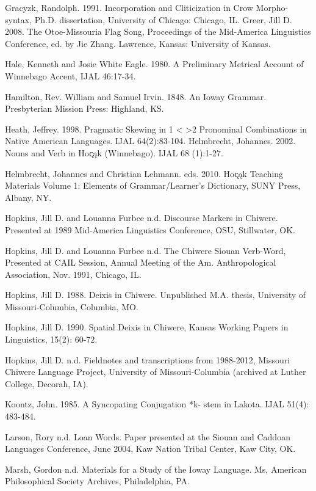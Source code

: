\documentclass[output=paper]{LSP/langsci}
\begin{document}
\begin{reflist}
Gracyzk, Randolph. 1991. Incorporation and Cliticization in Crow Morpho-syntax, Ph.D. dissertation,	University of Chicago:  Chicago, IL.   							    
Greer, Jill D.  2008.  The Otoe-Missouria Flag Song, Proceedings of the Mid-America Linguistics Conference, ed. by Jie Zhang.  Lawrence, Kansas:  University of Kansas. 		     

Hale, Kenneth and Josie White Eagle. 1980.  A Preliminary Metrical Account of Winnebago Accent, IJAL 46:17-34.   

Hamilton, Rev. William and Samuel Irvin. 1848.  An Ioway Grammar.  Presbyterian Mission Press:  Highland, KS.    	
									   
Heath, Jeffrey. 1998. Pragmatic Skewing in 1 < >2 Pronominal Combinations in Native American Languages. IJAL 64(2):83-104.    					      		      
Helmbrecht, Johannes.  2002.  Nouns and Verb in Ho\k{c}\k{a}k (Winnebago). IJAL 68 (1):1-27.  		                        

Helmbrecht, Johannes and Christian Lehmann. eds. 2010.  Ho\k{c}\k{a}k Teaching Materials Volume 1: Elements of Grammar/Learner's Dictionary,  SUNY Press, Albany, NY.

Hopkins, Jill D. and Louanna Furbee n.d. Discourse Markers in Chiwere. Presented at 1989 Mid-America Linguistics Conference, OSU, Stillwater, OK.  	   

Hopkins, Jill D. and Louanna Furbee  n.d. The Chiwere Siouan Verb-Word, Presented at CAIL  Session, Annual Meeting of the Am. Anthropological Association, Nov. 1991,  Chicago, IL.   

Hopkins, Jill D. 1988. Deixis in Chiwere. Unpublished M.A. thesis, University of Missouri-Columbia, Columbia, MO.								  	   

Hopkins, Jill D. 1990. Spatial Deixis in Chiwere, Kansas Working Papers in Linguistics, 15(2): 60-72. 
 
Hopkins, Jill D. n.d.  Fieldnotes and transcriptions from 1988-2012, Missouri Chiwere Language Project, University of Missouri-Columbia (archived at Luther College, Decorah, IA).  		
 
Koontz, John. 1985. A Syncopating Conjugation *k- stem in Lakota.  IJAL 51(4): 483-484.           
  
Larson, Rory n.d.  Loan Words. Paper presented at the Siouan and Caddoan Languages Conference, June 2004, Kaw Nation Tribal Center, Kaw City, OK.  	
  			  	   
Marsh, Gordon  n.d.  Materials for a Study of the Ioway Language.  Ms, American Philosophical Society Archives, Philadelphia, PA.  
  									    

\end{reflist}
\end{document}
